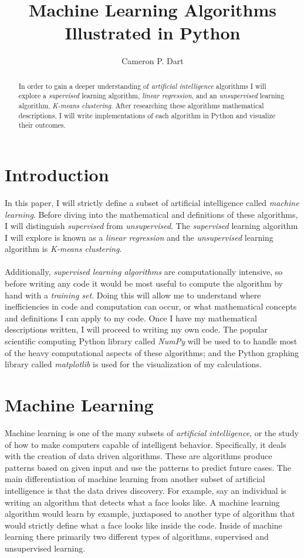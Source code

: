 \documentclass[12pt]{article}
\title{Machine Learning Algorithms Illustrated in Python}
\author{Cameron P. Dart}
\begin{document}
\maketitle

\begin{abstract}
In order to gain a deeper understanding of \textit{artificial intelligence} algorithms I will explore a \textit{supervised} learning algorithm, \textit{linear regression}, and an \textit{unsupervised} learning algorithm, \textit{K-means clustering}. After researching these algorithms mathematical descriptions, I will write implementations of each algorithm in Python and visualize their outcomes.
\end{abstract}
\section{Introduction}
In this paper, I will strictly define a subset of artificial intelligence called \textit{machine learning}. Before diving into the mathematical and definitions of these algorithms, I will distinguish \textit{supervised} from \textit{unsupervised}. The \textit{supervised} learning algorithm I will explore is known as a \textit{linear regression} and the \textit{unsupervised} learning algorithm is \textit{K-means clustering}.\\ \\
 Additionally, \textit{supervised learning algorithms} are computationally intensive, so before writing any code it would be most useful to compute the algorithm by hand with a \textit{training set}. Doing this will allow me to understand where inefficiencies in code and computation can occur, or what mathematical concepts and definitions I can apply to my code. Once I have my mathematical descriptions written, I will proceed to writing my own code. The popular scientific computing Python library called \textit{NumPy} \cite{NumPy} will be used to to handle most of the heavy computational aspects of these algorithms; and the Python graphing library called \textit{matplotlib} \cite{matplotlib} is used for the visualization of my calculations. 
\section{Machine Learning}
Machine learning is one of the many subsets of \textit{artificial intelligence}, or the study of how to make computers capable of intelligent behavior. Specifically, it deals with the creation of data driven algorithms. These are algorithms produce patterns based on given input and use the patterns to predict future cases. The main differentiation of machine learning from another subset of artificial intelligence is that the data drives discovery. For example, say an individual is writing an algorithm that detects what a face looks like. A machine learning algorithm would learn by example, juxtaposed to another type of algorithm that would strictly define what a face looks like inside the code. Inside of machine learning there primarily two different types of algorithms, supervised and unsupervised learning.
\end{document}
